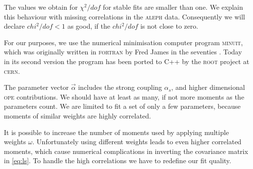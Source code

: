 \documentclass[../../index.tex]{subfiles}
\begin{document}
The values we obtain for \(\chi^2/dof\) for stable fits are smaller than one. We
explain this behaviour with missing correlations in the \textsc{aleph} data.
Consequently we will declare \(chi^2/dof < 1\) as good, if the \(chi^2/dof\) is not
close to zero.

For our purposes, we use the numerical minimisation computer program
\textsc{minuit}, which was originally written in \textsc{fortran} by Fred James
in the seventies \cite{James1975}. Today in its second version the program has
been ported to C++ by the \textsc{root} \cite{Brun1997} project at
\textsc{cern}.

The parameter vector \(\vec\alpha\) includes the strong coupling \(\alpha_s\),
and higher dimensional \textsc{ope} contributions. We should have at least as
many, if not more moments as the parameters count. We are limited to fit a set
of only a few parameters, because moments of similar weights are highly
correlated.

It is possible to increase the number of moments used by applying multiple
weights \(\omega\). Unfortunately using different weights leads to even higher
correlated moments, which cause numerical complications in inverting the
covariance matrix in \cref{eq:ls}. To handle the high correlations we have to
redefine our fit quality.
\end{document}
